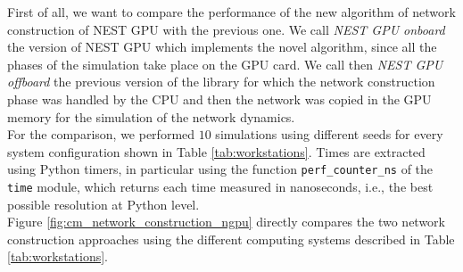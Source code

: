 \documentclass[a4paper, 12pt, twoside, openright]{book}
\begin{document}
\begin{table}[H]
\centering
{}
\caption{Hardware configuration of the different systems used to evaluate the performances. Cluster information is given on a per node basis.}
\label{tab:workstations}
\end{table}

First of all, we want to compare the performance of the new algorithm of network construction of NEST GPU with the previous one. We call \textit{NEST GPU onboard} the version of NEST GPU which implements the novel algorithm, since all the phases of the simulation take place on the GPU card. We call then \textit{NEST GPU offboard} the previous version of the library for which the network construction phase was handled by the CPU and then the network was copied in the GPU memory for the simulation of the network dynamics.\\
For the comparison, we performed $10$ simulations using different seeds for every system configuration shown in Table \ref{tab:workstations}. Times are extracted using Python timers, in particular using the function \texttt{perf\_counter\_ns} of the \texttt{time} module, which returns each time measured in nanoseconds, i.e., the best possible resolution at Python level.\\
Figure \ref{fig:cm_network_construction_ngpu} directly compares the two network construction approaches using the different computing systems described in Table \ref{tab:workstations}.
\end{document}
